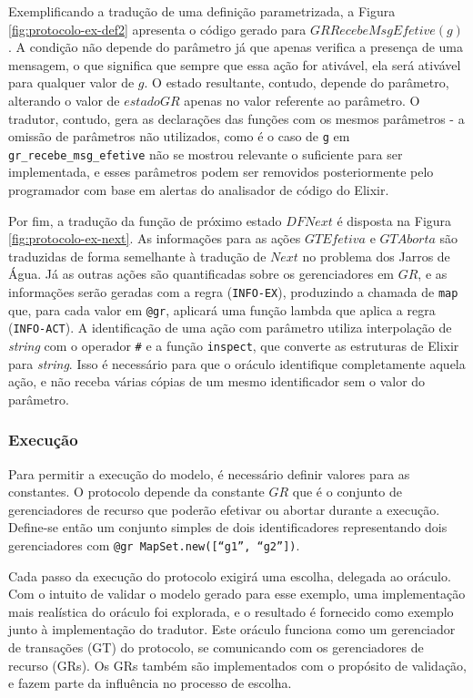 Exemplificando a tradução de uma definição parametrizada, a Figura
\ref{fig:protocolo-ex-def2} apresenta o código gerado para
$GRRecebeMsgEfetive(g)$. A condição não depende do parâmetro já que apenas
verifica a presença de uma mensagem, o que significa que sempre que essa ação
for ativável, ela será ativável para qualquer valor de $g$. O estado resultante,
contudo, depende do parâmetro, alterando o valor de $estadoGR$ apenas no valor
referente ao parâmetro. O tradutor, contudo, gera as declarações das funções com
os mesmos parâmetros - a omissão de parâmetros não utilizados, como é o caso de
\texttt{g} em \texttt{gr\_recebe\_msg\_efetive} não se mostrou relevante o
suficiente para ser implementada, e esses parâmetros podem ser removidos
posteriormente pelo programador com base em alertas do analisador de código do
Elixir.

Por fim, a tradução da função de próximo estado $DFNext$ é disposta na Figura
\ref{fig:protocolo-ex-next}. As informações para as ações $GTEfetiva$ e
$GTAborta$ são traduzidas de forma semelhante à tradução de $Next$ no problema
dos Jarros de Água. Já as outras ações são quantificadas sobre os gerenciadores
em $GR$, e as informações serão geradas com a regra (\texttt{INFO-EX}),
produzindo a chamada de \texttt{map} que, para cada valor em \texttt{@gr},
aplicará uma função lambda que aplica a regra (\texttt{INFO-ACT}). A
identificação de uma ação com parâmetro utiliza interpolação de \textit{string}
com o operador \texttt{#{}} e a função \texttt{inspect}, que converte as
estruturas de Elixir para \textit{string}. Isso é necessário para que o oráculo
identifique completamente aquela ação, e não receba várias cópias de um mesmo
identificador sem o valor do parâmetro.

\subsubsection{Execução}
Para permitir a execução do modelo, é necessário definir valores para as
constantes. O protocolo depende da constante $GR$ que é o conjunto de
gerenciadores de recurso que poderão efetivar ou abortar durante a execução.
Define-se então um conjunto simples de dois identificadores representando dois
gerenciadores com \texttt{@gr MapSet.new([``g1'', ``g2''])}.

Cada passo da execução do protocolo exigirá uma escolha, delegada ao oráculo.
Com o intuito de validar o modelo gerado para esse exemplo, uma implementação
mais realística do oráculo foi explorada, e o resultado é fornecido como exemplo
junto à implementação do tradutor. Este oráculo funciona como um gerenciador de
transações (GT) do protocolo, se comunicando com os gerenciadores de recurso
(GRs). Os GRs também são implementados com o propósito de validação, e fazem
parte da influência no processo de escolha.

